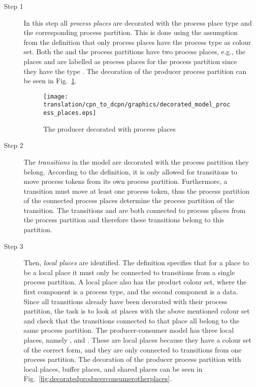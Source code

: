 \begin{description}
\item[Step 1] In this step all \emph{process places} are decorated with the process place type and the corresponding process partition. This is done using the assumption from the definition that only process places have the process type as colour set. Both the  and the  process partitions have two process places, e.g., the places  and  are labelled as process places for the  process partition since they have the type . The decoration of the producer process partition can be seen in Fig.~\ref{fig:decoratedproducerconsumerprocessplaces}.

\begin{figure}[h!]
\centering
\texttt{[image: translation/cpn\_to\_dcpn/graphics/decorated\_model\_process\_places.eps]}
\caption{The producer decorated with process places}
\label{fig:decoratedproducerconsumerprocessplaces}
\end{figure}

\item[Step 2] The \emph{transitions} in the model are decorated with the process partition they belong. According to the definition, it is only allowed for transitions to move process tokens from its own process partition. Furthermore, a transition must move at least one process token, thus the process partition of the connected process places determine the process partition of the transition. The transitions  and  are both connected to process places from the  process partition and therefore these transitions belong to this partition.

\item[Step 3] Then, \emph{local places} are identified. The definition specifies that for a place to be a local place it must only be connected to transitions from a single process partition. A local place also has the product colour set, where the first component is a process type, and the second component is a data. Since all transitions already have been decorated with their process partition, the task is to look at places with the above mentioned colour set and check that the transitions connected to that place all belong to the same process partition. The producer-consumer model has three local places, namely ,  and . These are local places because they have a colour set of the correct form, and they are only connected to transitions from one process partition. The decoration of the producer process partition with local places, buffer places, and shared places can be seen in Fig.~\ref{fig:decoratedproducerconsumerotherplaces}.


\end{description}
